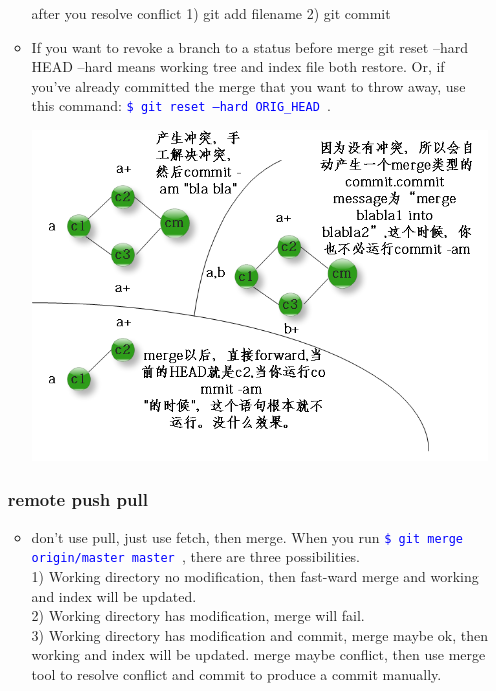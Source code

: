 \documentclass[a4paper,12pt,twoside]{book}
\newcommand{\linuxcommand}[1]{\texttt{\textcolor{blue}{\$ #1 \Pisymbol{psy}{191}}}}
\begin{document}
\begin{itemize}
\begin{itemize}
after you resolve conflict 1) git add filename 2) git commit


\item If you want to revoke a branch to a status before merge 
git reset --hard HEAD --hard means working tree and index file both restore.
Or, if you've already committed the merge that you want to throw away, use this command: \linuxcommand{git reset --hard ORIG\_HEAD}.

\includegraphics[scale=0.5]{pics/git-merge} \\
\end{itemize}

\subsubsection{remote push pull}
\begin{itemize}

\item don't use pull, just use fetch, then merge. 
When you run \linuxcommand{git merge origin/master master}, there are three possibilities. \\
1) Working directory no modification, then fast-ward merge and working and index will be updated. \\
2) Working directory has modification, merge will fail. \\
3) Working directory has modification and commit, merge maybe ok, then working and index will be updated. merge maybe conflict, then use merge tool to resolve conflict and commit to produce a commit manually. \\


\end{itemize}
\end{itemize}
\end{document}
